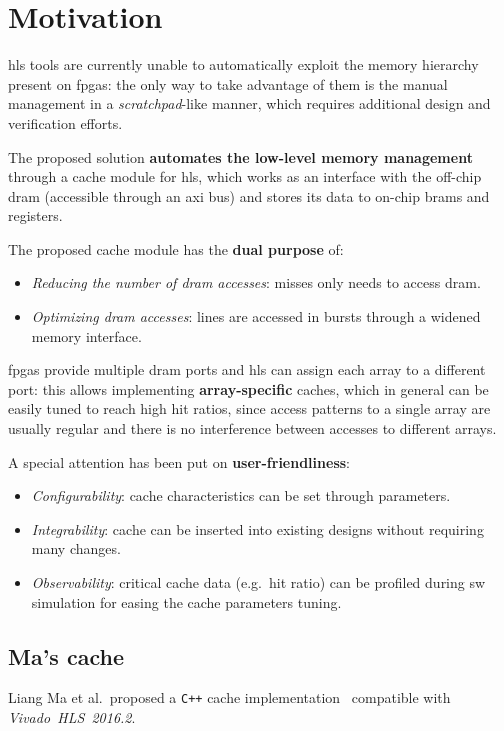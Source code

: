 \documentclass[11pt,a4paper,oneside]{memoir}
\begin{document}
\chapter{Motivation}
\ac{hls} tools are currently unable to automatically exploit the memory
hierarchy present on \acp{fpga}: the only way to take advantage of
them is the manual management in a \emph{scratchpad}-like manner, which
requires additional design and verification efforts.

The proposed solution \textbf{automates the low-level memory management}
through a cache module for \ac{hls}, which works as an interface with the
off-chip \ac{dram} (accessible through an \ac{axi} bus) and stores its data to
on-chip \acp{bram} and registers.

\bigskip
The proposed cache module has the \textbf{dual purpose} of:
\begin{itemize}
	\item \emph{Reducing the number of \ac{dram} accesses}: misses only
		needs to access \ac{dram}.
	\item \emph{Optimizing \ac{dram} accesses}: lines are accessed in
		bursts through a widened memory interface.
\end{itemize}

\acp{fpga} provide multiple \ac{dram} ports and \ac{hls} can assign each array
to a different port: this allows implementing \textbf{array-specific} caches,
which in general can be easily tuned to reach high hit ratios, since access
patterns to a single array are usually regular and there is no interference
between accesses to different arrays.

\bigskip
A special attention has been put on \textbf{user-friendliness}:
\begin{itemize}
	\item \emph{Configurability}: cache characteristics can be set through
		parameters.
	\item \emph{Integrability}: cache can be inserted into existing designs
		without requiring many changes.
	\item \emph{Observability}: critical cache data (e.g.\ hit ratio) can
		be profiled during \ac{sw} simulation for easing the cache
		parameters tuning.
\end{itemize}

\section{Ma's cache}
Liang Ma et al.\ proposed a \texttt{C++} cache implementation~\cite{liang}
compatible with \emph{Vivado\texttrademark~HLS~2016.2}.
\end{document}
